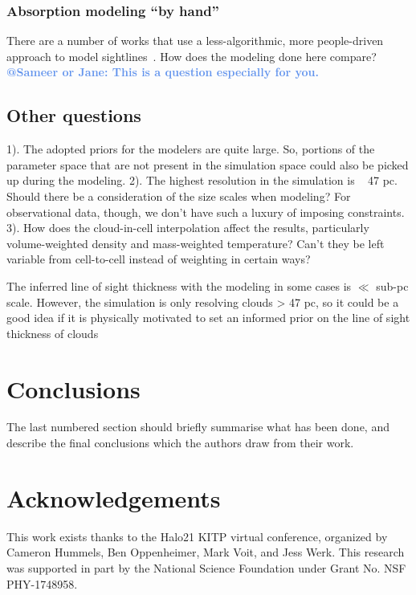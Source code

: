 \documentclass[fleqn,usenatbib]{mnras}
\makeatletter
\newcommand{\atsameer}[1]{\textcolor{CornflowerBlue}{\textbf{@Sameer or Jane: #1}}}
\makeatother
\begin{document}
\subsubsection{Absorption modeling ``by hand''}

There are a number of works that use a less-algorithmic, more people-driven approach to model sightlines~\citep[e.g.][]{Lacki2010}.
How does the modeling done here compare?
\atsameer{This is a question especially for you.}

\subsection{Other questions}

1). The adopted priors for the modelers are quite large. So, portions of the parameter space that are not present in the simulation space could also be picked up during the modeling.
2). The highest resolution in the simulation is ~ 47 pc. Should there be a consideration of the size scales when modeling? For observational data, though, we don't have such a luxury of imposing constraints.
3). How does the cloud-in-cell interpolation affect the results, particularly volume-weighted density and mass-weighted temperature? Can't they be left variable from cell-to-cell instead of weighting in certain ways?

The inferred line of sight thickness with the modeling in some cases is $\ll$ sub-pc scale.
However, the simulation is only resolving clouds > 47 pc, so it could be a good idea if it is physically motivated to set an informed prior on the line of sight thickness of clouds

\section{Conclusions}
\label{s: conclusions}

The last numbered section should briefly summarise what has been done, and describe
the final conclusions which the authors draw from their work.

\section*{Acknowledgements}

This work exists thanks to the Halo21 KITP virtual conference, organized by Cameron Hummels, Ben Oppenheimer, Mark Voit, and Jess Werk.
This research was supported in part by the National Science Foundation under Grant No. NSF PHY-1748958.
\end{document}
